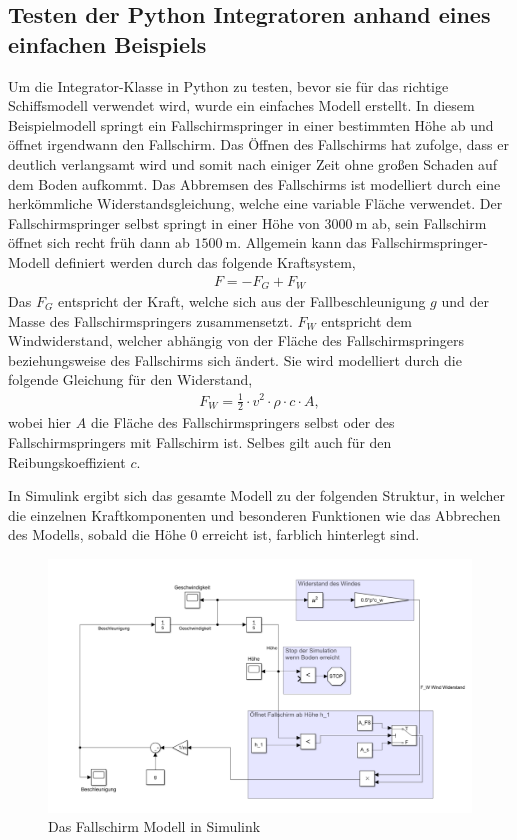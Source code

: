 \documentclass[]{iat}
\begin{document}
\subsection{Testen der Python Integratoren anhand eines einfachen Beispiels} \label{sec:integrator_test}
Um die Integrator-Klasse in Python zu testen, bevor sie für das richtige Schiffsmodell verwendet wird, wurde ein einfaches Modell erstellt. In diesem Beispielmodell springt ein Fallschirmspringer in einer bestimmten Höhe ab und öffnet irgendwann den Fallschirm. Das Öffnen des Fallschirms hat zufolge, dass er deutlich verlangsamt wird und somit nach einiger Zeit ohne großen Schaden auf dem Boden aufkommt. Das Abbremsen des Fallschirms ist modelliert durch eine herkömmliche Widerstandsgleichung, welche eine variable Fläche verwendet. Der Fallschirmspringer selbst springt in einer Höhe von $\SI{3000}{\m}$ ab, sein Fallschirm öffnet sich recht früh dann ab $\SI{1500}{\m}$. Allgemein kann das Fallschirmspringer-Modell definiert werden durch das folgende Kraftsystem,
\begin{align}
    F = -F_G + F_W
\end{align}
Das $F_G$ entspricht der Kraft, welche sich aus der Fallbeschleunigung $g$ und der Masse des Fallschirmspringers zusammensetzt. $F_W$ entspricht dem Windwiderstand, welcher abhängig von der Fläche des Fallschirmspringers beziehungsweise des Fallschirms sich ändert. Sie wird modelliert durch die folgende Gleichung für den Widerstand,
\begin{align}
    F_W = \frac{1}{2} \cdot v^2 \cdot \rho \cdot c \cdot A,
\end{align}
wobei hier $A$ die Fläche des Fallschirmspringers selbst oder des Fallschirmspringers mit Fallschirm ist. Selbes gilt auch für den Reibungskoeffizient $c$.

In Simulink ergibt sich das gesamte Modell zu der folgenden Struktur, in welcher die einzelnen Kraftkomponenten und besonderen Funktionen wie das Abbrechen des Modells, sobald die Höhe 0 erreicht ist, farblich hinterlegt sind.

\begin{figure}[H]
    \includegraphics[width=\textwidth]{graphics/parachute_simulink.png}
    \centering
    \caption{Das Fallschirm Modell in Simulink}
    \label{abb:parachute_simulink}
\end{figure}
\end{document}
